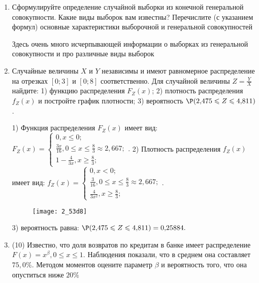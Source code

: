 \documentclass[a4paper,12pt]{article}
\begin{document}
\begin{enumerate}


\item


Сформулируйте определение случайной выборки из конечной генеральной совокупности. Какие
виды выборок вам известны? Перечислите (с указанием формул) основные характеристики выборочной и генеральной совокупностей




Здесь очень много исчерпывающей информации о выборках из генеральной совокупности и про различные виды выборок


\item



Случайные величины $X$ и $Y$ независимы и имеют равномерное
распределение на отрезках $[0;3]$ и $[0;8]$ соответственно. Для случайной величины $Z=\frac{Y}{X}$ найдите: 
1) функцию распределения $F_Z(x)$;
2) плотность распределения $f_Z(x)$ и постройте график плотности;
3) вероятность $\P(2,\!475\leqslant Z\leqslant 4,\!811)$.




1) Функция распределения $F_Z(x)$ имеет вид:
$
F_Z(x)=\left\{
\begin{array}{l}
0, x\leqslant 0;\\
\frac{3 x}{16}, 0\leqslant x\leqslant \frac{8}{3}\approx 2,\!667;\\
1 - \frac{4}{3 x}, x\geqslant\frac{8}{3};
\end{array}.
\right.
$
2) Плотность распределения $f_Z(x)$ имеет вид:
$
f_Z(x)=\left\{
\begin{array}{l}
0, x<0;\\
\frac{3}{16}, 0\leqslant x\leqslant \frac{8}{3}\approx 2,\!667;\\
\frac{4}{3 x^{2}}, x\geqslant\frac{8}{3};
\end{array}.
\right.
$


\begin{figure}[H]
    \texttt{[image: 2\_53d8]}
\end{figure}


3) вероятность равна:
$
\P(2,\!475\leqslant Z\leqslant 4,\!811)=
0,\!25884.
$


\item


(10) Известно, что доля возвратов по кредитам в банке имеет распределение $F(x) = x ^{\beta}, 0 \leqslant x \leqslant 1$.
Наблюдения показали, что в среднем она составляет $75,0\%$. Методом моментов оцените параметр $\beta$ и
вероятность того, что она опуститься ниже $20\%$





\end{enumerate}
\end{document}

